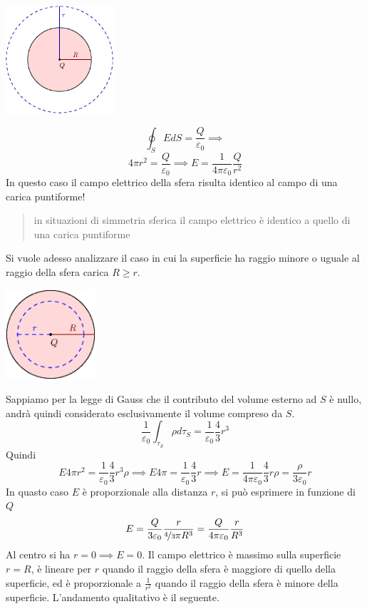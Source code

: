 \documentclass[10pt, letterpaper]{report}
\begin{document}
\begin{center}
    \includegraphics[width=0.3\textwidth]{images/sferaCarica.eps}
\end{center}
$$ \oint_S EdS=\frac{Q}{\varepsilon_0}\implies$$
$$ 4\pi r^2=\frac{Q}{\varepsilon_0}\implies 
E = \frac{1}{4\pi\varepsilon_0}\frac{Q}{ r^2}$$
In questo caso il campo elettrico della sfera risulta identico al campo di una carica puntiforme!
\begin{quote}
    in situazioni di simmetria sferica il campo elettrico è identico a quello di una carica puntiforme
\end{quote}
Si vuole adesso analizzare il caso in cui la superficie ha raggio minore o uguale al raggio della sfera carica $R\ge r$.
\begin{center}
    \includegraphics[width=0.25\textwidth]{images/sferaCarica2.eps}
\end{center}
Sappiamo per la legge di Gauss che il contributo del volume esterno ad $S$ è nullo, andrà quindi considerato esclusivamente il volume compreso da $S$. 
$$ \frac{1}{\varepsilon_0}\int_{\tau_S}\rho d\tau_S=\frac{1}{\varepsilon_0}\frac{4}{3}r^3$$
Quindi 
$$ E4\pi r^2=\frac{1}{\varepsilon_0}\frac{4}{3}r^3\rho\implies 
E4\pi=\frac{1}{\varepsilon_0}\frac{4}{3}r \implies E = \frac{1}{4\pi\varepsilon_0}\frac{4}{3}r\rho=\frac{\rho}{3\varepsilon_0}r$$
In quasto caso $E$ è proporzionale alla distanza $r$, si può esprimere in funzione di $Q$
$$ E=\frac{Q}{3\varepsilon_0}\frac{r}{\nicefrac{4}{3}\pi R^3}=\frac{Q}{4\pi\varepsilon_0}\frac{r}{R^3}$$
Al centro si ha $r=0\implies E=0$. Il campo elettrico è massimo sulla superficie $r=R$, è lineare per $r$ quando il raggio della sfera è maggiore di quello della superficie, ed è proporzionale a $\frac{1}{r^2}$ quando il raggio della sfera è minore della superficie. L'andamento qualitativo è il seguente.
\end{document}
